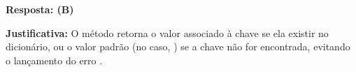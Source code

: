 \ifmostrarGabarito
\textbf{Resposta: (B)}

\textbf{Justificativa:}
O método  retorna o valor associado à chave se ela existir no dicionário, ou o valor padrão (no caso, ) se a chave não for encontrada, evitando o lançamento do erro .

\fi
